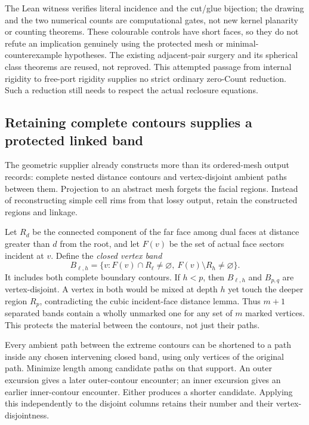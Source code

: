 The Lean witness verifies literal incidence and the cut/glue bijection;
the drawing and the two numerical counts are computational gates, not
new kernel planarity or counting theorems. These colourable controls have
short faces, so they do not refute an implication genuinely using the
protected mesh or minimal-counterexample hypotheses. The existing
adjacent-pair surgery and its spherical class theorems are reused, not
reproved. This attempted passage from internal rigidity to free-port
rigidity supplies no strict ordinary zero-Count reduction. Such a
reduction still needs to respect the actual reclosure equations.

\subsection{Retaining complete contours supplies a protected linked band}
\label{sec:protected-linked-band}

The geometric supplier already constructs more than its ordered-mesh
output records: complete nested distance contours and vertex-disjoint
ambient paths between them. Projection to an abstract mesh forgets the
facial regions. Instead of reconstructing simple cell rims from that
lossy output, retain the constructed regions and linkage.

Let $R_d$ be the connected component of the far face among dual faces
at distance greater than $d$ from the root, and let $F(v)$ be the set
of actual face sectors incident at $v$. Define the \emph{closed vertex
band}
\[
 B_{\ell,h}=\{v:F(v)\cap R_\ell\ne\varnothing,
                      \ F(v)\setminus R_h\ne\varnothing\}.
\]
It includes both complete boundary contours. If $h<p$, then
$B_{\ell,h}$ and $B_{p,q}$ are vertex-disjoint. A vertex in both would
be mixed at depth $h$ yet touch the deeper region $R_p$, contradicting
the cubic incident-face distance lemma. Thus $m+1$ separated bands
contain a wholly unmarked one for any set of $m$ marked vertices.
This protects the material between the contours, not just their paths.

Every ambient path between the extreme contours can be shortened to a
path inside any chosen intervening closed band, using only vertices of
the original path. Minimize length among candidate paths on that support.
An outer excursion gives a later outer-contour encounter; an inner
excursion gives an earlier inner-contour encounter. Either produces a
shorter candidate. Applying this independently to the disjoint columns
retains their number and their vertex-disjointness.

